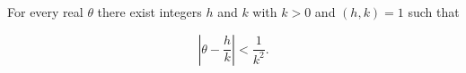 For every real $\theta$ there exist integers $h$ and $k$ with $k > 0$ and $(h, k) = 1$ such that

$$\left| \theta - \frac{h}{k} \right| < \frac{1}{k^2}.$$
